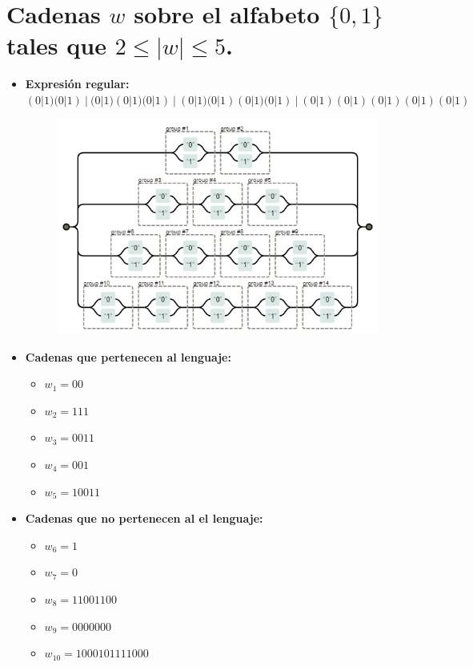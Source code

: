\documentclass[11pt]{report}
\begin{document}
\section{Cadenas $w$ sobre el alfabeto \texorpdfstring{$\{0, 1\}$}{\{0, 1\}} tales que $2\leq |w| \leq 5$.}
\begin{itemize}
  \item \textbf{Expresión regular:} $(0|1)(0|1) \ | \ (0|1)(0|1)(0|1) \ | \ (0|1)(0|1)(0|1)(0|1) \ | \ (0|1)(0|1)(0|1)(0|1)(0|1)$
    \begin{figure}[H]
      \centering
      \includegraphics[scale=0.7]{img/op_basicos_05.png}
    \end{figure}
  \item \textbf{Cadenas que pertenecen al lenguaje: }
    \begin{itemize}
      \item $w_1 = 00$
      \item $w_2 = 111$
      \item $w_3 = 0011$
      \item $w_4 = 001$
      \item $w_5 = 10011$
    \end{itemize}
  \item \textbf{Cadenas que no pertenecen al el lenguaje: }
    \begin{itemize}
      \item $w_6 = 1$
      \item $w_7 = 0$
      \item $w_8 = 11001100$
      \item $w_9 = 0000000$
      \item $w_{10} = 1000101111000$
    \end{itemize}
\end{itemize}
\end{document}
